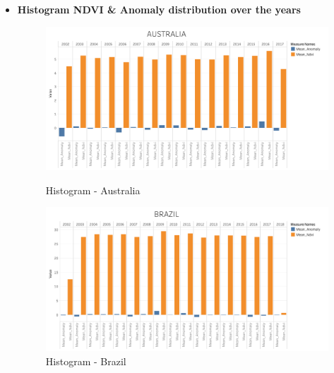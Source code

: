 \begin{itemize}
    \clearpage
    \newpage

    
    \item \textbf{Histogram NDVI \& Anomaly distribution over the years}

    \begin{figure}[!htb]
        \begin{minipage}{0.5\textwidth}
            \centering
            \includegraphics[width=1.0\linewidth]{figures/ch5/Histograms/AUSTRALIA_histogram.png}
            \caption{Histogram - Australia}\label{Fig:AUSTRALIA_histogram}
        \end{minipage}\hfill
        \begin{minipage}{0.5\textwidth}
            \centering
            \includegraphics[width=1.0\linewidth]{figures/ch5/Histograms/BRAZIL_histogram.png}
            \caption{Histogram - Brazil}\label{Fig:BRAZIL_histogram}
        \end{minipage}
    \end{figure}
    

\end{itemize}
